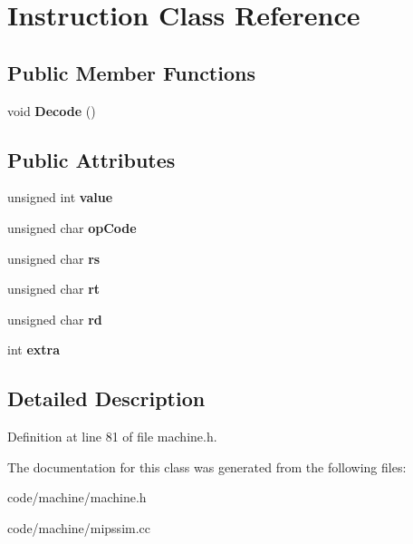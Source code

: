 \section{Instruction Class Reference}
\label{class_instruction}
\subsection*{Public Member Functions}
\begin{DoxyCompactItemize}
\item 
void {\bfseries Decode} ()\label{class_instruction_acbdc34d695f5fa324a8418ef7a916814}

\end{DoxyCompactItemize}
\subsection*{Public Attributes}
\begin{DoxyCompactItemize}
\item 
unsigned int {\bfseries value}\label{class_instruction_a2064608446020ab71465daac2f66488c}

\item 
unsigned char {\bfseries op\+Code}\label{class_instruction_a6641032fb5153319be1789ba63fe210a}

\item 
unsigned char {\bfseries rs}\label{class_instruction_ac357d6666daf8fd25160974ab6a90fe6}

\item 
unsigned char {\bfseries rt}\label{class_instruction_a4c4966454413e2c3c0c6113b67e0590c}

\item 
unsigned char {\bfseries rd}\label{class_instruction_a53a3868c12e80929872bddf3a66ecd75}

\item 
int {\bfseries extra}\label{class_instruction_a194c6318e79c1a8dde023b1f2be2a593}

\end{DoxyCompactItemize}


\subsection{Detailed Description}


Definition at line 81 of file machine.\+h.



The documentation for this class was generated from the following files\+:\begin{DoxyCompactItemize}
\item 
code/machine/machine.\+h\item 
code/machine/mipssim.\+cc\end{DoxyCompactItemize}
